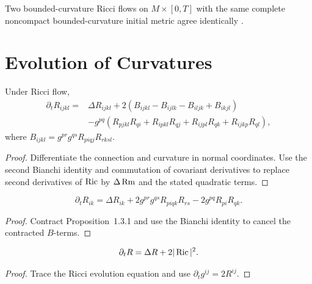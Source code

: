 \begin{theorem}
  \label{thm:cz-bounded-curvature-uniqueness-on-complete-noncompact-manifolds}
Two bounded-curvature Ricci flows on $M\times[0,T]$ with the same
complete noncompact bounded-curvature initial metric agree identically
\cite{CZ05U}.
\end{theorem}

\section{Evolution of Curvatures}

\begin{proposition}
  \label{prop:cz-evolution-of-the-riemann-curvature-tensor}
Under Ricci flow,
\begin{align*}
\partial_tR_{ijkl}={}&\Delta R_{ijkl}
+2(B_{ijkl}-B_{ijlk}-B_{iljk}+B_{ikjl})\\
&-g^{pq}(R_{pjkl}R_{qi}+R_{ipkl}R_{qj}+R_{ijpl}R_{qk}+R_{ijkp}R_{ql}),
\end{align*}
where $B_{ijkl}=g^{pr}g^{qs}R_{piqj}R_{rksl}$.
\cite{Ha82}
\end{proposition}
\begin{proof}
\sketch Differentiate the connection and curvature in normal
coordinates.  Use the second Bianchi identity and commutation of
covariant derivatives to replace second derivatives of $\operatorname{Ric}$ by
$\Delta\operatorname{Rm}$ and the stated quadratic terms.
\end{proof}

\begin{corollary}
  \label{cor:cz-evolution-of-the-ricci-tensor}
\[
\partial_tR_{ik}=\Delta R_{ik}+2g^{pr}g^{qs}R_{piqk}R_{rs}
-2g^{pq}R_{pi}R_{qk}.
\]
\end{corollary}
\begin{proof}
\sketch Contract Proposition~1.3.1 and use the Bianchi identity to
cancel the contracted $B$-terms.
\end{proof}

\begin{corollary}
  \label{cor:cz-evolution-of-scalar-curvature}
\[
\partial_tR=\Delta R+2|\operatorname{Ric}|^2.
\]
\end{corollary}
\begin{proof}
\sketch Trace the Ricci evolution equation and use
$\partial_tg^{ij}=2R^{ij}$.
\end{proof}


